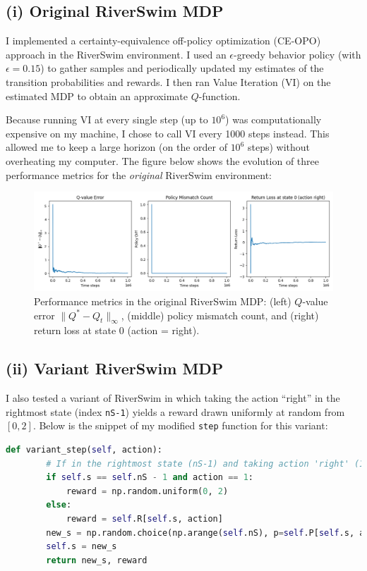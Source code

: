 \subsection*{(i) Original RiverSwim MDP}
I implemented a certainty-equivalence off-policy optimization (CE-OPO) approach in the RiverSwim environment. 
I used an $\epsilon$-greedy behavior policy (with $\epsilon=0.15$) to gather samples and periodically updated 
my estimates of the transition probabilities and rewards. I then ran Value Iteration (VI) on the estimated MDP 
to obtain an approximate $Q$-function. 

Because running VI at every single step (up to $10^6$) was computationally expensive on my machine, I chose to 
call VI every 1000 steps instead. This allowed me to keep a large horizon (on the order of $10^6$ steps) without 
overheating my computer. The figure below shows the evolution of three performance metrics for the \emph{original} 
RiverSwim environment:

\begin{figure}[H]
    \centering
    \includegraphics[width=1\textwidth]{Code/RiverSwim_CE-OPO.png}
    \caption{Performance metrics in the original RiverSwim MDP: (left) $Q$-value error $\|Q^* - Q_t\|_\infty$, 
    (middle) policy mismatch count, and (right) return loss at state 0 (action = right).}
    \label{fig:original}
\end{figure}

\subsection*{(ii) Variant RiverSwim MDP}
I also tested a variant of RiverSwim in which taking the action ``right'' in the rightmost state 
(index \texttt{nS-1}) yields a reward drawn uniformly at random from $[0,2]$. Below is the snippet of my modified 
\texttt{step} function for this variant:

\begin{lstlisting}[language=Python, caption={Definition of the variant\_step function.}, basicstyle=\ttfamily\small]
    def variant_step(self, action):
        # If in the rightmost state (nS-1) and taking action 'right' (1):
        if self.s == self.nS - 1 and action == 1:
            reward = np.random.uniform(0, 2)
        else:
            reward = self.R[self.s, action]
        new_s = np.random.choice(np.arange(self.nS), p=self.P[self.s, action])
        self.s = new_s
        return new_s, reward
\end{lstlisting}

